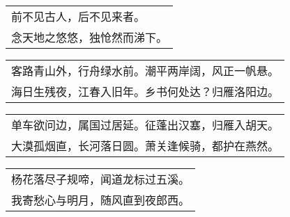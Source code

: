 \noindent\begin{minipage}{\linewidth}
  \vskip-3pt\begin{table}[H]
    \centering
    \begin{tabular}{@{}l@{}}
前不见古人，后不见来者。\\
念天地之悠悠，独怆然而涕下。
    \end{tabular}
  \end{table}
\end{minipage}
\vspace{1cm}


\noindent\begin{minipage}{\linewidth}
  \vskip-3pt\begin{table}[H]
    \centering
    \begin{tabular}{@{}l@{}}
客路青山外，行舟绿水前。潮平两岸阔，风正一帆悬。\\
海日生残夜，江春入旧年。乡书何处达？归雁洛阳边。
    \end{tabular}
  \end{table}
\end{minipage}
\vspace{1cm}


\noindent\begin{minipage}{\linewidth}
  \vskip-3pt\begin{table}[H]
    \centering
    \begin{tabular}{@{}l@{}}
单车欲问边，属国过居延。征蓬出汉塞，归雁入胡天。\\
大漠孤烟直，长河落日圆。萧关逢候骑，都护在燕然。
    \end{tabular}
  \end{table}
\end{minipage}
\vspace{1cm}


\noindent\begin{minipage}{\linewidth}
  \vskip-3pt\begin{table}[H]
    \centering
    \begin{tabular}{@{}l@{}}
杨花落尽子规啼，闻道龙标过五溪。\\
我寄愁心与明月，随风直到夜郎西。
    \end{tabular}
  \end{table}
\end{minipage}
\vspace{1cm}


